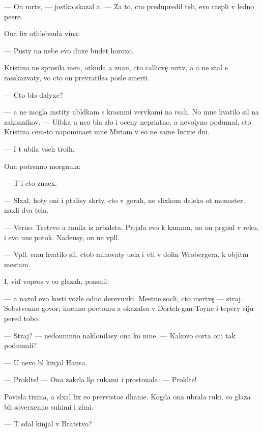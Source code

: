 \documentclass[10pt]{book}
\begin{document}
— On m{\e}rtv, — jostko skazal {\y}a. — Za to, cto predupredil teb{\ia}, {\y}evo rasp{\ia}li v led{\ia}no{\y} pe{\x}ere.

Ona lix othlebnula vina:

— Pusty na nebe {\y}evo duxe budet horoxo.

Kristina ne sprosila men{\ia}, otkuda {\y}a zna{\y}u, cto callicve{\c} m{\e}rtv, a {\y}a ne stal {\y}e{\y} rasskaz{\yi}vaty, vo cto on prevratilsa posle smerti.

— Cto b{\yi}lo dalyxe?

— {\Y}a ne mogla mstity ubl{\io}dkam s krasn{\yi}mi ver{\e}vkami na r{\ia}sah. No mne hvatilo sil na zakonnikov. — Ul{\yi}bka u ne{\y}o b{\yi}la zlo{\y} i oceny nepri{\y}atno{\y}. {\Y}a nevolyno podumal, cto Kristina cem-to napomina{\y}et mne Miriam v {\y}e{\y}o ne sam{\yi}{\y}e lucxi{\y}e dni.

— I t{\yi} ubila vseh tro{\y}ih.

Ona potr{\ia}s{\e}nno morgnula:

— T{\yi} i eto zna{\y}ex.

— Sl{\yi}xal, hoty oni i p{\yi}talisy skr{\yi}ty, cto v gorah, ne slixkom daleko ot monaster{\ia}, naxli dva tela.

— Verno. Tret{\y}evo {\y}a ranila iz arbaleta. Prijala {\y}evo k kamn{\ia}m, no on pr{\yi}gnul v reku, i {\y}evo un{\e}s potok. Nade{\y}usy, on ne v{\yi}pl{\yi}l.

— V{\yi}pl{\yi}l. {\Y}emu hvatilo sil, ctob{\yi} minovaty u{\x}el{\y}a i v{\yi}{\y}ti v dolin{\yi} Wrobergera, k objit{\yi}m mestam.

I, vid{\ia} vopros v {\y}e{\y}o glazah, po{\y}asnil:

— {\Y}a naxol {\y}evo kosti vozle odno{\y} derevuxki. Mestn{\yi}{\y}e socli, cto mertve{\c} — straj. Sobstvenno govor{\ia}, imenno poetomu {\y}a okazalsa v Dortch-gan-Toyne i tepery siju pered tobo{\y}.

— Straj? — nedoum{\e}nno naklonilasy ona ko mne. — Kakovo corta oni tak podumali?

— U nevo b{\yi}l kinjal Hansa.

— Prokl{\ia}t{\y}e! — Ona zakr{\yi}la li{\c}o rukami i prostonala: — Prokl{\ia}t{\y}e!

Povisla tixina, {\y}a sl{\yi}xal lix {\y}e{\y}o prer{\yi}visto{\y}e d{\yi}hani{\y}e. Kogda ona ubrala ruki, {\y}e{\y}o glaza b{\yi}li soverxenno suhimi i zl{\yi}mi.

— T{\yi} sdal kinjal v Bratstvo?
\end{document}
